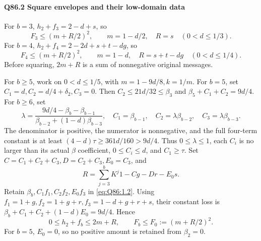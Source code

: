 \paragraph{Q86.2 Square envelopes and their low-domain data}
For \(b=\allowbreak 3\), \(h_2+f_3=\allowbreak 2-d+s\), so
\[
F_3\le(m+R/2)^2,\qquad m=1-d/2,\quad R=s
\quad(0<d\le1/3).
\tag{Q86.2.1}\label{eq:Q86:2.1}
\]
For \(b=\allowbreak 4\), \(h_2+f_4=\allowbreak 2-2d+s+t-dg\), so
\[
F_4\le(m+R/2)^2,\qquad m=1-d,\quad R=s+t-dg
\quad(0<d\le1/4).
\tag{Q86.2.2}\label{eq:Q86:2.2}
\]
Before squaring, \(2m+R\) is a sum of nonnegative original messages.

For \(b\ge\allowbreak 5\), work on \(0<\allowbreak d\le\allowbreak 1/5\), with \(m=\allowbreak 1-9d/8,\allowbreak k=\allowbreak 1/m\).
For \(b=\allowbreak 5\), set \(C_1=\allowbreak d,\allowbreak C_2=\allowbreak d/4+\delta_2,\allowbreak C_3=\allowbreak 0\).
Then \(C_2\le\allowbreak 21d/32\le\allowbreak \beta_3\) and
\(\beta_5+C_1+C_2=\allowbreak 9d/4\).
For \(b\ge\allowbreak 6\), set
\[
\lambda=\frac{9d/4-\beta_b-\beta_{b-1}}
{\beta_{b-2}+(1-d)\beta_{b-3}},\quad
C_1=\beta_{b-1},\quad C_2=\lambda\beta_{b-2},\quad
C_3=\lambda\beta_{b-3}.
\]
The denominator is positive, the numerator is nonnegative, and the full four-term constant is at least
\((4-d)\tau\ge\allowbreak 361d/160>\allowbreak 9d/4\).
Thus \(0\le\allowbreak \lambda\le\allowbreak 1\), each \(C_i\) is no larger than its actual \(\beta\) coefficient,
\(0\le\allowbreak  C_i\le\allowbreak  d\), and \(C_1\ge\allowbreak \tau\).
Set \(C=\allowbreak C_1+C_2+C_3,\allowbreak D=\allowbreak C_2+C_3,\allowbreak E_0=\allowbreak C_3\), and
\[
R=\sum_{j=3}^bK^j1-Cg-Dr-E_0s.
\tag{Q86.2.3}\label{eq:Q86:2.3}
\]
Retain \(\beta_b,\allowbreak C_1f_1,\allowbreak C_2f_2,\allowbreak E_0f_3\) in \eqref{eq:Q86:1.2}.
Using \(f_1=\allowbreak 1+g,\allowbreak f_2=\allowbreak 1+g+r,\allowbreak f_3=\allowbreak 1-d+g+r+s\), their constant loss is
\(\beta_b+C_1+C_2+(1-d)E_0=\allowbreak 9d/4\). Hence
\[
0\le h_2+f_b\le2m+R,\qquad F_b\le F_0:=(m+R/2)^2.
\tag{Q86.2.4}\label{eq:Q86:2.4}
\]
For \(b=\allowbreak 5\), \(E_0=\allowbreak 0\), so no positive amount is retained from \(\beta_2=\allowbreak 0\).


